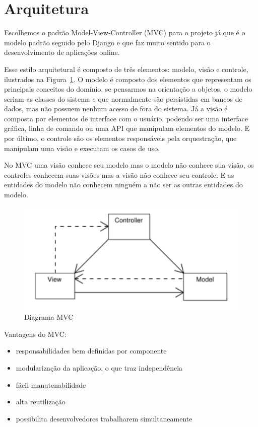 \documentclass[a4paper, 12pt, oneside]{book}
\begin{document}
\section{Arquitetura}

Escolhemos o padrão Model-View-Controller (MVC) para o projeto já que é o modelo padrão seguido pelo Django e que faz muito sentido para o desenvolvimento de aplicações online.

Esse estilo arquitetural é composto de três elementos: modelo, visão e controle, ilustrados na Figura~\ref{fig:mvc}. O modelo é composto dos elementos que representam os principais conceitos do domínio, se pensarmos na orientação a objetos, o modelo seriam as classes do sistema e que normalmente são persistidas em bancos de dados, mas não possuem nenhum acesso de fora do sistema. Já a visão é composta por elementos de interface com o usuário, podendo ser uma interface gráfica, linha de comando ou uma API que manipulam elementos do modelo. E por último, o controle são os elementos responsáveis pela orquestração, que manipulam uma visão e executam os casos de uso.

No MVC uma visão conhece seu modelo mas o modelo não conhece sua visão, os controles conhecem suas visões mas a visão não conhece seu controle. E as entidades do modelo não conhecem ninguém a não ser as outras entidades do modelo.

\begin{figure}[H]
\centering
\includegraphics[scale=0.4]{mvc.png}
\caption{Diagrama MVC \cite{mvc-murta}}
\label{fig:mvc}
\end{figure}

Vantagens do MVC:
\begin{itemize}
\item responsabilidades bem definidas por componente
\item modularização da aplicação, o que traz independência 
\item fácil manutenabilidade
\item alta reutilização
\item possibilita desenvolvedores trabalharem simultaneamente
\end{itemize}
\end{document}
